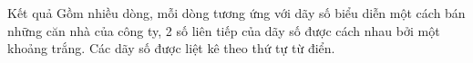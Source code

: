 Kết quả
Gồm nhiều dòng, mỗi dòng tương ứng với dãy số biểu diễn một cách bán những căn nhà của công ty, 2 số liên tiếp của dãy số được cách nhau bởi một khoảng trắng. Các dãy số được liệt kê theo thứ tự từ điển.